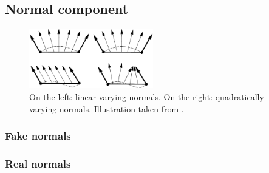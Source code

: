 
\subsection{Normal component}
\label{ss:normal_component}
\begin{figure}
	\centering
	\includegraphics[width=0.48\textwidth]{./content/img/method/lin_vs_quad_varying_normals(inspiration).png}
	\caption{On the left: linear varying normals. On the right: quadratically varying normals. Illustration taken from \citeauthor{van1997phong}\textcite{van1997phong}. }
	\label{fig:3:linear_vs_quadratic_varying_normals}
\end{figure}

\subsubsection{Fake normals}
\label{sss:method:normals:fakeNormals}

\subsubsection{Real normals}
\label{sss:method:normals:realNormals}
